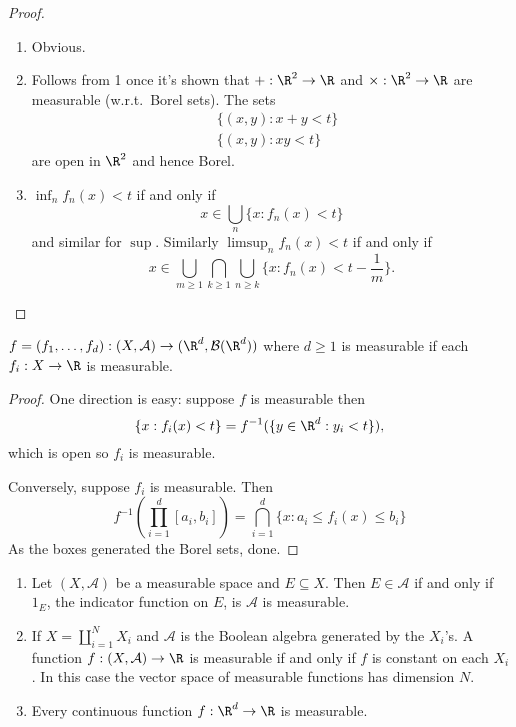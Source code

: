 \documentclass[a4paper]{article}
\begin{document}
\begin{proof}\leavevmode
  \begin{enumerate}
  \item Obvious.
  \item Follows from 1 once it's shown that \(+: \R^2 \to \R\) and \(\times: \R^2 \to \R\) are measurable (w.r.t.\ Borel sets). The sets
    \begin{align*}
      &\{(x, y): x + y < t\} \\
      &\{(x, y): xy < t\}
    \end{align*}
    are open in \(\R^2\) and hence Borel.
  \item \(\inf_n f_n(x) < t\) if and only if
    \[
      x \in \bigcup_n \{x: f_n(x) < t\}
    \]
    and similar for \(\sup\). Similarly \(\limsup_n f_n(x) < t\) if and only if
    \[
      x \in \bigcup_{m \geq 1} \bigcap_{k \geq 1} \bigcup_{n \geq k} \{x: f_n(x) < t - \frac{1}{m}\}.
    \]
  \end{enumerate}
\end{proof}

\begin{proposition}
  \(f = (f_1, \dots, f_d): (X, \mathcal A) \to (\R^d, \mathcal B(\R^d))\) where \(d \geq 1\) is measurable if each \(f_i: X \to \R\) is measurable.
\end{proposition}

\begin{proof}
  One direction is easy: suppose \(f\) is measurable then
  \[
    \{x: f_i(x) < t\} = f^{-1}(\{y \in \R^d: y_i < t\}),
  \]
  which is open so \(f_i\) is measurable.

  Conversely, suppose \(f_i\) is measurable. Then
  \[
    f^{-1}( \prod_{i = 1}^d [a_i, b_i] )
    = \bigcap_{i = 1}^d \{x: a_i \leq f_i(x) \leq b_i\}
  \]
  As the boxes generated the Borel sets, done.
\end{proof}

\begin{eg}\leavevmode
  \begin{enumerate}
  \item Let \((X, \mathcal A)\) be a measurable space and \(E \subseteq X\). Then \(E \in \mathcal A\) if and only if \(1_E\), the indicator function on \(E\), is \(\mathcal A\) is measurable.
  \item If \(X = \coprod_{i = 1}^N X_i\) and \(\mathcal A\) is the Boolean algebra generated by the \(X_i\)'s. A function \(f: (X, \mathcal A) \to \R\) is measurable if and only if \(f\) is constant on each \(X_i\). In this case the vector space of measurable functions has dimension \(N\).
  \item Every continuous function \(f: \R^d \to \R\) is measurable.
  \end{enumerate}
\end{eg}
\end{document}
